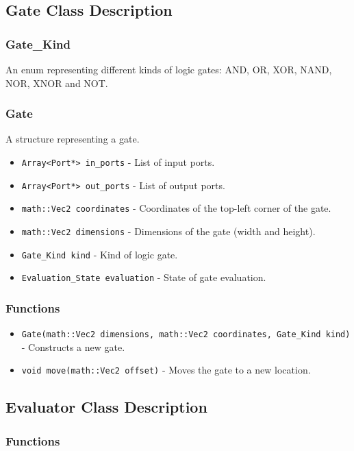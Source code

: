 \documentclass{article}
\begin{document}
\subsection*{Gate Class Description}

\subsubsection*{Gate\_Kind}
An enum representing different kinds of logic gates: AND, OR, XOR, NAND, NOR, XNOR and NOT.



\subsubsection*{Gate}
A structure representing a gate.

\begin{itemize}
    \item \texttt{Array<Port*> in\_ports} - List of input ports.
    \item \texttt{Array<Port*> out\_ports} - List of output ports.
    \item \texttt{math::Vec2 coordinates} - Coordinates of the top-left corner of the gate.
    \item \texttt{math::Vec2 dimensions} - Dimensions of the gate (width and height).
    \item \texttt{Gate\_Kind kind} - Kind of logic gate.
    \item \texttt{Evaluation\_State evaluation} - State of gate evaluation.
\end{itemize}

\subsubsection*{Functions}

\begin{itemize}
    \item \texttt{Gate(math::Vec2 dimensions, math::Vec2 coordinates, Gate\_Kind kind)} - Constructs a new gate.
    \item \texttt{void move(math::Vec2 offset)} - Moves the gate to a new location.
\end{itemize}

\subsection*{Evaluator Class Description}

\subsubsection*{Functions}
\end{document}
